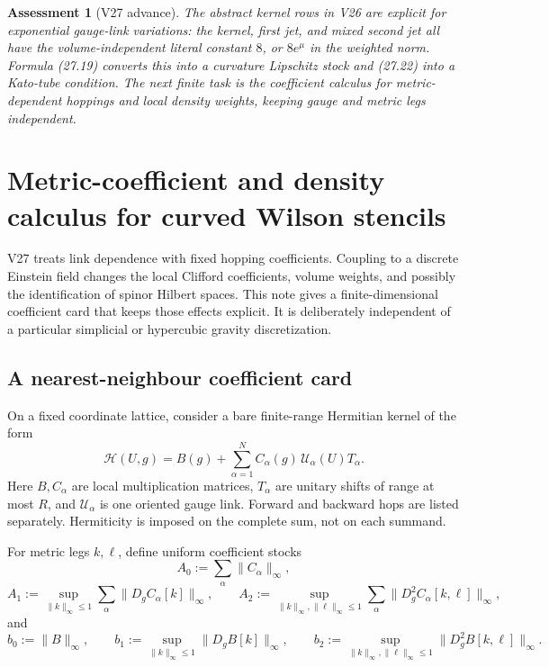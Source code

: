 \documentclass[11pt]{article}
\newtheorem{assessment}[theorem]{Assessment}
\begin{document}
\begin{assessment}[V27 advance]
\label{ass:v11v27}
The abstract kernel rows in V26 are explicit for exponential gauge-link
variations: the kernel, first jet, and mixed second jet all have the
volume-independent literal constant \(8\), or \(8e^\mu\) in the weighted
norm.  Formula (27.19) converts this into a curvature Lipschitz stock and
(27.22) into a Kato-tube condition.  The next finite task is the
coefficient calculus for metric-dependent hoppings and local density
weights, keeping gauge and metric legs independent.
\end{assessment}
\section{Metric-coefficient and density calculus for curved Wilson stencils}
\label{sec:v11v28}

V27 treats link dependence with fixed hopping coefficients.  Coupling to
a discrete Einstein field changes the local Clifford coefficients,
volume weights, and possibly the identification of spinor Hilbert
spaces.  This note gives a finite-dimensional coefficient card that
keeps those effects explicit.  It is deliberately independent of a
particular simplicial or hypercubic gravity discretization.

\subsection{A nearest-neighbour coefficient card}

On a fixed coordinate lattice, consider a bare finite-range Hermitian
kernel of the form
\[
 \mathscr H(U,g)
 =
 B(g)+\sum_{\alpha=1}^{N}
 C_\alpha(g)\,\mathcal U_\alpha(U)T_\alpha.
 \tag{28.1}
\]
Here \(B,C_\alpha\) are local multiplication matrices,
\(T_\alpha\) are unitary shifts of range at most \(R\), and
\(\mathcal U_\alpha\) is one oriented gauge link.  Forward and backward
hops are listed separately.  Hermiticity is imposed on the complete
sum, not on each summand.

For metric legs \(k,\ell\), define uniform coefficient stocks
\[
 A_0:=\sum_\alpha\|C_\alpha\|_\infty,
 \tag{28.2}
\]
\[
 A_1:=\sup_{\|k\|_\infty\leq1}
 \sum_\alpha\|D_gC_\alpha[k]\|_\infty,\qquad
 A_2:=\sup_{\|k\|_\infty,\|\ell\|_\infty\leq1}
 \sum_\alpha\|D_g^2C_\alpha[k,\ell]\|_\infty,
 \tag{28.3}
\]
and
\[
 b_0:=\|B\|_\infty,\qquad
 b_1:=\sup_{\|k\|_\infty\leq1}\|D_gB[k]\|_\infty,
 \qquad
 b_2:=\sup_{\|k\|_\infty,\|\ell\|_\infty\leq1}
 \|D_g^2B[k,\ell]\|_\infty.
 \tag{28.4}
\]
\end{document}
